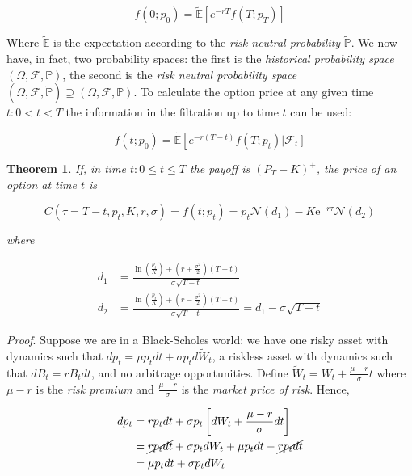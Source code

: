 \documentclass[oneside,titlepage,headinclude,12pt,a4paper,BCOR5mm,footinclude]{book}
\theoremstyle{defn}
\newtheorem{theo}{Theorem}
\newcommand{\eexp}{\mathrm{e}}
\begin{document}
\[
  f(0;p_0) = \tilde{\mathbb{E}} \left[ e^{-rT} f(T;p_T)\right]
\]

Where $\tilde{\mathbb{E}}$  is the  expectation according to  the \textit{risk
neutral  probability}   $\tilde{\mathbb{P}}$.  We  now  have,   in  fact,  two
probability  spaces: the  first is  the \textit{historical  probability space}
$(\Omega,\mathcal{F},\mathbb{P})$,  the  second  is the  \textit{risk  neutral
probability  space}   $(\Omega,  \mathcal{F},   \tilde{\mathbb{P}})  \supseteq
(\Omega,\mathcal{F},\mathbb{P})$. To  calculate the option price  at any given
time $t : 0 <  t < T$ the information in the filtration up  to time $t$ can be
used:

\[
  f(t;p_0) = \tilde{\mathbb{E}} \left[ e^{-r(T-t)} f(T;p_t) \left| \mathcal{F}_t\right]
\]

\begin{theo} 
  If, in time $t: 0 \leq t \leq T$ the payoff is $(P_T - K)^+$, the price of an option
  at time $t$ is
  
  \[
    C(\tau = T-t, p_t, K, r, \sigma) = f(t;p_t) = p_t \mathcal{N}(d_1) - K\eexp^{-r\tau} \mathcal{N}(d_2)
  \]

  where

  \begin{align*}
    d_1 &= \frac{\ln\left(\frac{p_t}{K}\right) + \left(r + \frac{\sigma^2}{2}\right)(T-t)}{\sigma \sqrt{T-t}}
    \\
    d_2 &= \frac{\ln\left(\frac{p_t}{K}\right) + \left(r - \frac{\sigma^2}{2}\right)(T-t)}{\sigma \sqrt{T-t}} = d_1 - \sigma\sqrt{T-t}
  \end{align*}
\end{theo}

\textit{Proof}. Suppose  we are in  a Black-Scholes  world: we have  one risky
asset with dynamics such that $dp_t = \mu p_t dt + \sigma p_t d\tilde{W}_t$, a
riskless asset  with dynamics  such that  $dB_t = rB_t  dt$, and  no arbitrage
opportunities.  Define  $\tilde{W}_t  =  W_t  +  \frac{\mu-r}{\sigma}t$  where
$\mu-r$  is  the  \textit{risk  premium}  and  $\frac{\mu-r}{\sigma}$  is  the
\textit{market price of risk}. Hence,

\begin{align*}
  dp_t & = rp_t dt + \sigma p_t \left[ dW_t + \frac{\mu-r}{\sigma}dt \right]
  \\ & = \cancel{rp_tdt} + \sigma p_t dW_t + \mu p_t dt - \cancel{rp_t dt}
  \\ & = \mu p_t dt + \sigma p_t dW_t
\end{align*}
\end{document}
